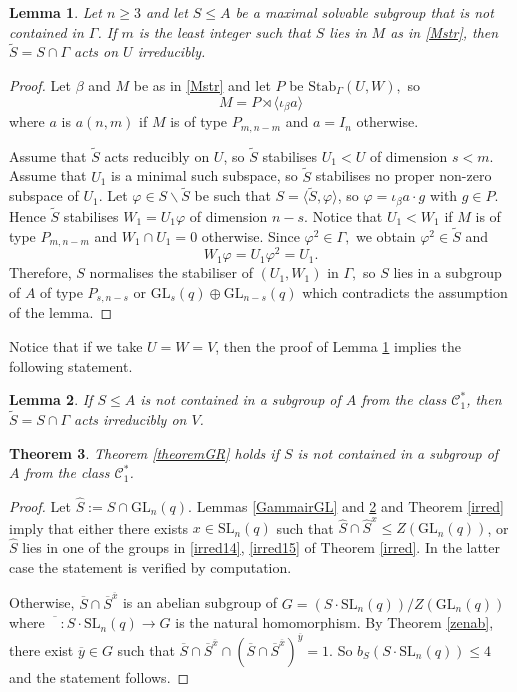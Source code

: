 \documentclass[a4paper,reqno,11pt]{amsart}
\newtheorem{Th}{Theorem}[section]
\newtheorem{Lem}[Th]{Lemma}
\theoremstyle{definition}
\theoremstyle{remark}
\numberwithin{equation}{section}
\newcommand{\SL}{{\mathrm{SL}}}
\newcommand{\GL}{{\mathrm{GL}}}
\begin{document}
\begin{Lem}
\label{GRmmim2}
Let $n\ge 3$ and let $S \le A$ be a maximal solvable subgroup that is not contained in $\Gamma$. If $m$ is the least integer such that $S$ lies in $M$ as in \eqref{Mstr}, then 
 $\tilde{S}=S \cap \Gamma$ acts  on $U$ irreducibly.
\end{Lem} 
\begin{proof}
Let $\beta$ and $M$ be as in \eqref{Mstr} and let $P$ be $\mathrm{Stab}_{\Gamma}(U,W),$ so 
$$M=P \rtimes \langle \iota_{\beta} a\rangle$$
where $a$ is $a(n,m)$ if $M$ is of type $P_{m,n-m}$ and $a=I_n$ otherwise.


Assume that $\tilde{S}$ acts  reducibly on $U$, so  $\tilde{S}$ stabilises $U_1 <U$ of dimension $s<m.$  Assume that $U_1$ is a minimal such subspace, so $\tilde{S}$ stabilises no proper non-zero subspace of $U_1.$ Let $\varphi \in S \backslash \tilde{S}$ be such that
$S=\langle \tilde{S}, \varphi \rangle$, so $\varphi=\iota_{\beta}a \cdot g$ with $g \in P.$  Hence $\tilde{S}$ stabilises $W_1=U_1 \varphi$ of dimension  $n-s$. Notice that $U_1<W_1$ if $M$ is of type $P_{m,n-m}$ and $W_1 \cap U_1=0$ otherwise.
Since $\varphi^2 \in \Gamma,$ we obtain $\varphi^2 \in \tilde{S}$ and   $$W_1\varphi=U_1\varphi^2=U_1.$$
Therefore, $S$ normalises the stabiliser of $(U_1, W_1)$ in $\Gamma,$ so $S$ lies in a  subgroup of $A$ of type $P_{s, n-s}$ or $\GL_{s}(q) \oplus \GL_{n-s}(q)$  which contradicts the assumption of the lemma. 
\end{proof}

Notice that if we take $U=W=V$, then the proof of Lemma \ref{GRmmim2} implies the following statement.
\begin{Lem}
\label{GRirred2}
If $S \le A$ is not contained  in a  subgroup of $A$ from the class $\mathcal{C}_1^*$, then $\tilde{S}=S \cap \Gamma$ acts irreducibly on $V$.
\end{Lem}

\begin{Th}
Theorem {\rm \ref{theoremGR}} holds if $S$ is not contained  in a subgroup of $A$ from the class $\mathcal{C}_1^*$.
\end{Th}
\begin{proof}
Let $\hat{S}:=S \cap \GL_n(q).$ Lemmas \ref{GammairGL}  and \ref{GRirred2} and Theorem \ref{irred} imply that either there exists $x \in \SL_n(q)$ such that $\hat{S} \cap \hat{S}^x \le Z(\GL_n(q))$, or $\hat{S}$ lies in one of the groups in \ref{irred14}, \ref{irred15} of Theorem \ref{irred}. In the latter case the statement is verified by computation. 

Otherwise, $\overline{S} \cap \overline{S}^{\overline{x}}$ is an abelian subgroup of $G=(S \cdot \SL_n(q))/Z(\GL_n(q))$ where $\overline{\phantom{G}}:S \cdot \SL_n(q) \to G$ is the natural homomorphism.  By Theorem \ref{zenab}, there exist $\overline{y} \in G$ such that $\overline{S} \cap \overline{S}^{\overline{x}} \cap (\overline{S} \cap \overline{S}^{\overline{x}})^{\overline{y}}=1.$ So $b_S(S \cdot \SL_n(q)) \le 4$ and the statement follows. 
\end{proof}
\end{document}
